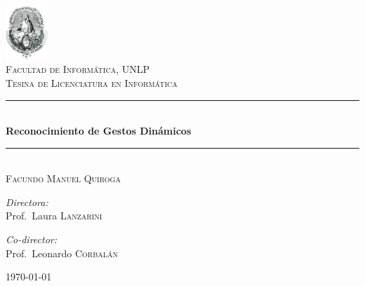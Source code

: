 
\begin{titlepage}
\begin{center}

\newcommand{\HRule}{\rule{\linewidth}{0.5mm}}

\includegraphics[width=0.12\textwidth]{img/unlp}~\\[1cm]

\textsc{\LARGE Facultad de Informática, UNLP}\\[1.5cm]

\textsc{\Large Tesina de Licenciatura en Informática}\\[0.5cm]

\HRule \\[0.4cm]
{ \huge \bfseries Reconocimiento de Gestos Dinámicos \\[0.4cm] }

\HRule \\[1.5cm]


\textsc{\Large Facundo Manuel Quiroga}\\[0.5cm]

\begin{minipage}{0.4\textwidth}
\begin{flushleft} \large
\emph{Directora:}\\
Prof.~Laura \textsc{Lanzarini}
\end{flushleft}
\end{minipage}
\begin{minipage}{0.5\textwidth}
\begin{flushright} \large
\emph{Co-director:} \\
Prof.~Leonardo \textsc{Corbalán}
\end{flushright}
\end{minipage}

\vfill

{\large \today}

\end{center}
\end{titlepage}

